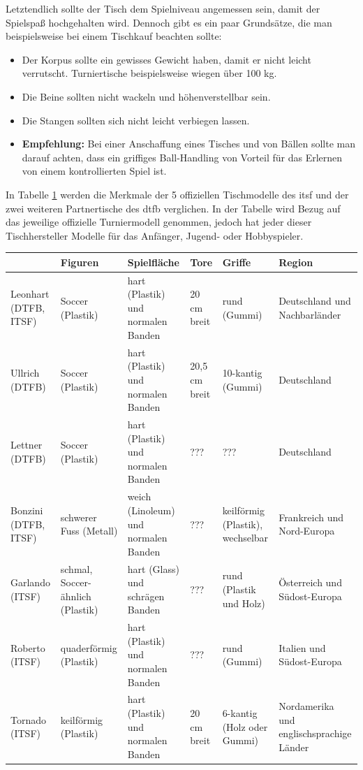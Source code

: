 Letztendlich sollte der Tisch dem Spielniveau angemessen sein, damit der Spielspaß hochgehalten wird. Dennoch gibt es ein paar Grundsätze, die man beispielsweise bei einem Tischkauf beachten sollte:
\begin{itemize}
\item Der Korpus sollte ein gewisses Gewicht haben, damit er nicht leicht verrutscht. Turniertische beispielsweise wiegen über 100 kg.
\item Die Beine sollten nicht wackeln und höhenverstellbar sein.
\item Die Stangen sollten sich nicht leicht verbiegen lassen.
\item {\bf Empfehlung:} Bei einer Anschaffung eines Tisches und von Bällen sollte man darauf achten, dass ein griffiges Ball-Handling von Vorteil für das Erlernen von einem kontrollierten Spiel ist.
\end{itemize}

In Tabelle \ref{tab:tische} werden die Merkmale der 5 offiziellen Tischmodelle des \gls{itsf} und der zwei weiteren Partnertische des \gls{dtfb} verglichen. In der Tabelle wird Bezug auf das jeweilige offizielle Turniermodell genommen, jedoch hat jeder dieser Tischhersteller Modelle für das Anfänger, Jugend- oder Hobbyspieler.    

{\small
\begin{center} 
\begin{table} 
\begin{tabular}{ p{1.5cm}||p{2cm}|p{2cm}|p{2cm}|p{2cm}|p{2cm}} 
 	& Figuren & Spielfläche & Tore & Griffe & Region \\ 
\hline 
\hline 
Leonhart (DTFB, ITSF) & Soccer (Plastik) & hart (Plastik) und normalen Banden & 20 cm breit & rund (Gummi) & Deutschland und Nachbarländer \\ 
\hline 
Ullrich  (DTFB) &  Soccer (Plastik) &  hart (Plastik) und normalen Banden & 20,5 cm breit & 10-kantig (Gummi) & Deutschland \\ 
\hline 
Lettner (DTFB)  & Soccer (Plastik)  &  hart (Plastik) und normalen Banden & ??? & ??? & Deutschland \\ 
\hline 
Bonzini (DTFB, ITSF)  & schwerer Fuss (Metall) & weich (Linoleum) und normalen Banden & ??? & keilförmig (Plastik), wechselbar & Frankreich und Nord-Europa \\ 
\hline 
Garlando (ITSF)  & schmal, Soccer-ähnlich (Plastik) &  hart (Glass) und schrägen Banden & ??? & rund (Plastik und Holz) & Österreich und Südost-Europa \\ 
\hline 
Roberto (ITSF) & quaderförmig (Plastik) &  hart (Plastik) und normalen Banden & ??? & rund (Gummi) & Italien und Südost-Europa \\ 
\hline 
Tornado (ITSF)  & keilförmig (Plastik) &  hart (Plastik) und normalen Banden & 20 cm breit & 6-kantig (Holz oder Gummi) & Nordamerika und englischsprachige Länder \\ 
\end{tabular} 
\label{tab:tische}
\end{table} 
\end{center}
}



